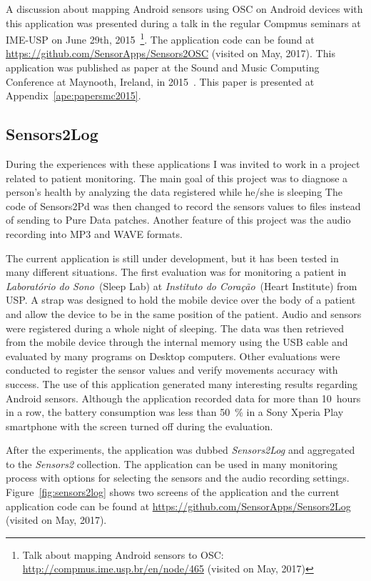 A discussion about mapping Android sensors using OSC on Android devices with this application was presented during a talk in the regular Compmus seminars at IME-USP on June 29th, 2015~\footnote{Talk about mapping Android sensors to OSC: \url{http://compmus.ime.usp.br/en/node/465} (visited on May, 2017)}.
The application code can be found at \url{https://github.com/SensorApps/Sensors2OSC} (visited on May, 2017).
This application was published as paper at the Sound and Music Computing Conference at Maynooth, Ireland, in 2015~\citep{deCarvalhoJunior2015sensors2osc}.
This paper is presented at Appendix~\ref{ape:papersmc2015}.

\subsection*{Sensors2Log}
\label{apesubsec:appsensors2log}

During the experiences with these applications I was invited to work in a project related to patient monitoring. %
The main goal of this project was to diagnose a person's health by analyzing the data registered while he/she is sleeping
The code of Sensors2Pd was then changed to record the sensors values to files instead of sending to Pure Data patches.
Another feature of this project was the audio recording into MP3 and WAVE formats.

The current application is still under development, but it has been tested in many different situations.
The first evaluation was for monitoring a patient in \textit{Laboratório do Sono}~(Sleep Lab) at \textit{Instituto do Coração}~(Heart Institute) from USP.
A strap was designed to hold the mobile device over the body of a patient and allow the device to be in the same position of the patient.
Audio and sensors were registered during a whole night of sleeping.
The data was then retrieved from the mobile device through the internal memory using the USB cable and evaluated by many programs on Desktop computers.
Other evaluations were conducted to register the sensor values and verify movements accuracy with success.
The use of this application generated many interesting results regarding Android sensors.
Although the application recorded data for more than 10~hours in a row, the battery consumption was less than 50~\% in a Sony Xperia Play smartphone with the screen turned off during the evaluation.

After the experiments, the application was dubbed \textit{Sensors2Log} and aggregated to the \textit{Sensors2} collection.
The application can be used in many monitoring process with options for selecting the sensors and the audio recording settings.
Figure~\ref{fig:sensors2log} shows two screens of the application and the current application code can be found at \url{https://github.com/SensorApps/Sensors2Log} (visited on May, 2017).

